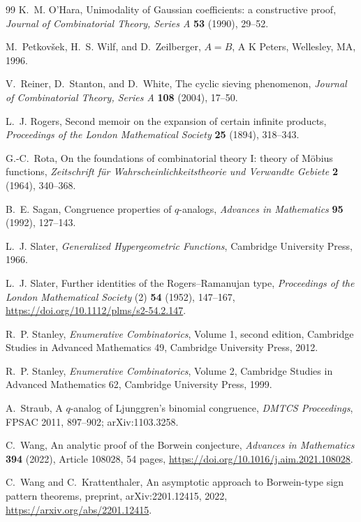\documentclass[11pt,a4paper,oneside,openany]{book}
\theoremstyle{definition}
\theoremstyle{remark}
\begin{document}
\begin{thebibliography}{99}
K.~M. O'Hara,
Unimodality of Gaussian coefficients: a constructive proof,
\emph{Journal of Combinatorial Theory, Series A} \textbf{53} (1990), 29--52.

M.~Petkov\v{s}ek, H.~S. Wilf, and D.~Zeilberger,
\emph{$A=B$},
A K Peters, Wellesley, MA, 1996.

V.~Reiner, D.~Stanton, and D.~White,
The cyclic sieving phenomenon,
\emph{Journal of Combinatorial Theory, Series A} \textbf{108} (2004), 17--50.

L.~J. Rogers,
Second memoir on the expansion of certain infinite products,
\emph{Proceedings of the London Mathematical Society} \textbf{25} (1894), 318--343.

G.-C.~Rota,
On the foundations of combinatorial theory I: theory of M\"obius functions,
\emph{Zeitschrift f\"ur Wahrscheinlichkeitstheorie und Verwandte Gebiete} \textbf{2} (1964), 340--368.

B.~E. Sagan,
Congruence properties of $q$-analogs,
\emph{Advances in Mathematics} \textbf{95} (1992), 127--143.

L.~J. Slater,
\emph{Generalized Hypergeometric Functions},
Cambridge University Press, 1966.

L.~J. Slater,
Further identities of the Rogers--Ramanujan type,
\emph{Proceedings of the London Mathematical Society} (2)
\textbf{54} (1952), 147--167,
\url{https://doi.org/10.1112/plms/s2-54.2.147}.

R.~P. Stanley,
\emph{Enumerative Combinatorics}, Volume 1, second edition,
Cambridge Studies in Advanced Mathematics 49, Cambridge University Press, 2012.

R.~P. Stanley,
\emph{Enumerative Combinatorics}, Volume 2,
Cambridge Studies in Advanced Mathematics 62, Cambridge University Press, 1999.

A.~Straub,
A $q$-analog of Ljunggren's binomial congruence,
\emph{DMTCS Proceedings}, FPSAC 2011, 897--902; arXiv:1103.3258.

C.~Wang,
An analytic proof of the Borwein conjecture,
\emph{Advances in Mathematics} \textbf{394} (2022), Article 108028,
54 pages,
\url{https://doi.org/10.1016/j.aim.2021.108028}.

C.~Wang and C.~Krattenthaler,
An asymptotic approach to Borwein-type sign pattern theorems,
preprint, arXiv:2201.12415, 2022,
\url{https://arxiv.org/abs/2201.12415}.


\end{thebibliography}
\end{document}
